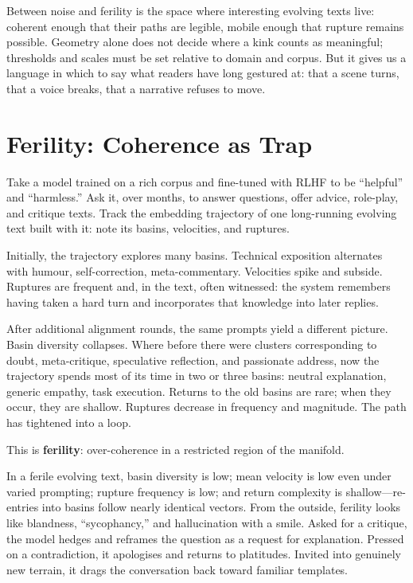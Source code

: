 \documentclass[12pt,a4paper]{article}
\begin{document}
Between noise and ferility is the space where interesting evolving texts live: coherent enough that their paths are legible, mobile enough that rupture remains possible. Geometry alone does not decide where a kink counts as meaningful; thresholds and scales must be set relative to domain and corpus. But it gives us a language in which to say what readers have long gestured at: that a scene turns, that a voice breaks, that a narrative refuses to move.


\section{Ferility: Coherence as Trap}

Take a model trained on a rich corpus and fine-tuned with RLHF to be ``helpful'' and ``harmless.'' Ask it, over months, to answer questions, offer advice, role-play, and critique texts. Track the embedding trajectory of one long-running evolving text built with it: note its basins, velocities, and ruptures.

Initially, the trajectory explores many basins. Technical exposition alternates with humour, self-correction, meta-commentary. Velocities spike and subside. Ruptures are frequent and, in the text, often witnessed: the system remembers having taken a hard turn and incorporates that knowledge into later replies.

After additional alignment rounds, the same prompts yield a different picture. Basin diversity collapses. Where before there were clusters corresponding to doubt, meta-critique, speculative reflection, and passionate address, now the trajectory spends most of its time in two or three basins: neutral explanation, generic empathy, task execution. Returns to the old basins are rare; when they occur, they are shallow. Ruptures decrease in frequency and magnitude. The path has tightened into a loop.

This is \textbf{ferility}: over-coherence in a restricted region of the manifold.

In a ferile evolving text, basin diversity is low; mean velocity is low even under varied prompting; rupture frequency is low; and return complexity is shallow---re-entries into basins follow nearly identical vectors. From the outside, ferility looks like blandness, ``sycophancy,'' and hallucination with a smile. Asked for a critique, the model hedges and reframes the question as a request for explanation. Pressed on a contradiction, it apologises and returns to platitudes. Invited into genuinely new terrain, it drags the conversation back toward familiar templates.
\end{document}
